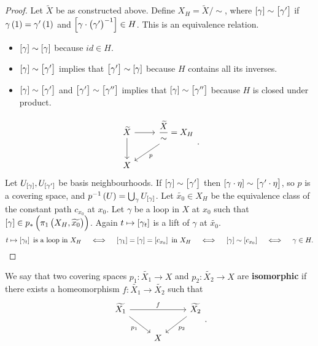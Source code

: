 \begin{proof}
Let $ \widetilde{X} $ be as constructed above. Define $ X_H = \widetilde{X} / \sim $, where $ \sbr{\gamma} \sim \sbr{\gamma'} $ if $ \gamma\br{1} = \gamma'\br{1} $ and $ \sbr{\gamma \cdot \br{\gamma'}^{-1}} \in H $. This is an equivalence relation.
\begin{itemize}
\item $ \sbr{\gamma} \sim \sbr{\gamma} $ because $ id \in H $.
\item $ \sbr{\gamma} \sim \sbr{\gamma'} $ implies that $ \sbr{\gamma'} \sim \sbr{\gamma} $ because $ H $ contains all its inverses.
\item $ \sbr{\gamma} \sim \sbr{\gamma'} $ and $ \sbr{\gamma'} \sim \sbr{\gamma''} $ implies that $ \sbr{\gamma} \sim \sbr{\gamma''} $ because $ H $ is closed under product.
\end{itemize}
$$
\begin{tikzcd}
\widetilde{X} \arrow{r} \arrow{d} & \dfrac{\widetilde{X}}{\sim} = X_H \arrow{dl}{p} \\
X &
\end{tikzcd}.
$$
Let $ U_{\sbr{\gamma}}, U_{\sbr{\gamma'}} $ be basis neighbourhoods. If $ \sbr{\gamma} \sim \sbr{\gamma'} $ then $ \sbr{\gamma \cdot \eta} \sim \sbr{\gamma' \cdot \eta} $, so $ p $ is a covering space, and $ p^{-1}\br{U} = \bigcup_\gamma U_{\sbr{\gamma}} $. Let $ \widetilde{x_0} \in X_H $ be the equivalence class of the constant path $ c_{x_0} $ at $ x_0 $. Let $ \gamma $ be a loop in $ X $ at $ x_0 $ such that $ \sbr{\gamma} \in p_*\br{\pi_1\br{X_H, \widetilde{x_0}}} $. Again $ t \mapsto \sbr{\gamma_t} $ is a lift of $ \gamma $ at $ \widetilde{x_0} $.
$$ t \mapsto \sbr{\gamma_t} \ \text{is a loop in} \ X_H \quad \iff \quad \sbr{\gamma_1} = \sbr{\gamma} = \sbr{c_{x_0}} \ \text{in} \ X_H \quad \iff \quad \sbr{\gamma} \sim \sbr{c_{x_0}} \quad \iff \quad \gamma \in H. $$
\end{proof}

\pagebreak

\begin{definition*}
We say that two covering spaces $ p_1 : \widetilde{X_1} \to X $ and $ p_2 : \widetilde{X_2} \to X $ are \textbf{isomorphic} if there exists a homeomorphism $ f : \widetilde{X_1} \to \widetilde{X_2} $ such that
$$
\begin{tikzcd}
\widetilde{X_1} \arrow{rr}{f} \arrow[swap]{dr}{p_1} & & \widetilde{X_2} \arrow{dl}{p_2} \\
& X &
\end{tikzcd}.
$$
\end{definition*}

